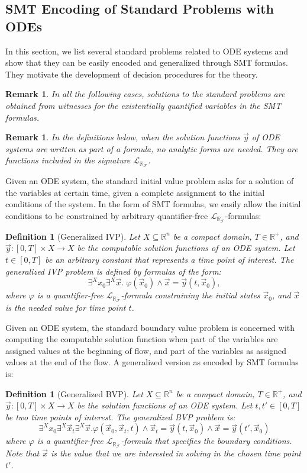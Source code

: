 \documentclass[12pt]{article}
\newtheorem{definition}[theorem]{Definition}
\newtheorem{remark}[theorem]{Remark}
\newcommand{\lrf}{\mathcal{L}_{\mathbb{R}_{\mathcal{F}}}}
\begin{document}
\subsection{SMT Encoding of Standard Problems with ODEs}
\label{encoding}
In this section, we list several standard problems related to ODE systems and show that they can be easily encoded and generalized through SMT formulas. They motivate the development of decision procedures for the theory. 
\begin{remark}
In all the following cases, solutions to the standard problems are obtained from witnesses for the existentially quantified variables in the SMT formulas.
\end{remark}
\begin{remark}
In the definitions below, when the solution functions $\vec y$ of ODE systems are written as part of a formula, no analytic forms are needed. They are functions included in the signature $\lrf$. 
\end{remark}
 Given an ODE system, the standard initial value problem asks for a solution of the variables at certain time, given a complete assignment to the initial conditions of the system. In the form of SMT formulas, we easily allow the initial conditions to be constrained by arbitrary quantifier-free $\lrf$-formulas:
\begin{definition}[Generalized IVP]
Let $X\subseteq \mathbb{R}^n$ be a compact domain, $T\in \mathbb{R}^+$, and $\vec y: [0,T]\times X\rightarrow X$ be the computable solution functions of an ODE system.  Let $t\in [0,T]$ be an arbitrary constant that represents a time point of interest. The generalized IVP problem is defined by formulas of the form:
$$\exists^{X} x_0\exists^{X} \vec x.\; \varphi(\vec x_0)\wedge \vec x = \vec y(t,\vec x_0),$$
where $\varphi$ is a quantifier-free $\lrf$-formula constraining the initial states $\vec x_0$, and $\vec x$ is the needed value for time point $t$. 
\end{definition}
 Given an ODE system, the standard boundary value problem is concerned with computing the computable solution function when part of the variables are assigned values at the beginning of flow, and part of the variables as assigned values at the end of the flow. A generalized version as encoded by SMT formulas is:
\begin{definition}[Generalized BVP]
Let $X\subseteq \mathbb{R}^n$ be a compact domain, $T\in \mathbb{R}^+$, and $\vec y: [0,T]\times X\rightarrow X$ be the solution functions of an ODE system. Let $t, t'\in [0,T]$ be two time points of interest. The generalized BVP problem is:
$$
\exists^{X} x_0\exists^{X}\vec x_t\exists^X \vec x.\varphi(\vec x_{0},\vec x_t,t)\wedge \vec x_t = \vec y(t,\vec x_0)\wedge \vec x = \vec y(t',\vec x_0)
$$
where $\varphi$ is a quantifier-free $\lrf$-formula that specifies the boundary conditions. Note that $\vec x$ is the value that we are interested in solving in the chosen time point $t'$.
\end{definition}
\end{document}

